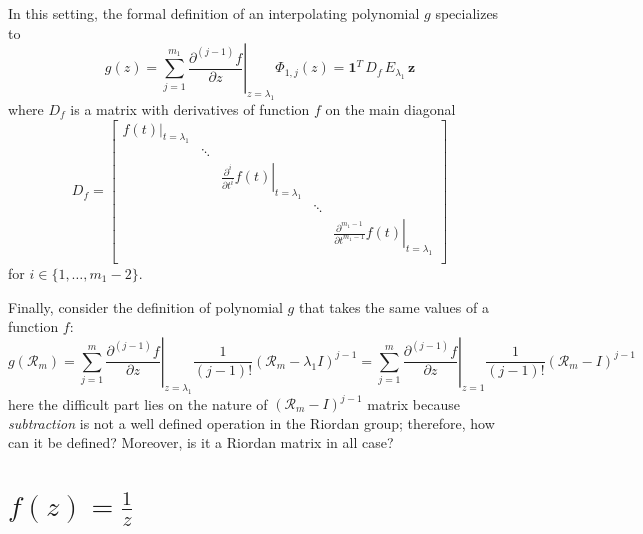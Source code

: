 In this setting, the formal definition of an interpolating polynomial $g$ specializes to
\begin{displaymath}
g(z) = \sum_{j=1}^{m_{1}}{ \left.  \frac{\partial^{(j-1)}{f}}{\partial{z}} \right|_{z=\lambda_{1}}\Phi_{1,j}(z) } = \boldsymbol{1}^{T}\,D_{f}\, E_{\lambda_{1}} \,\boldsymbol{z}
\end{displaymath}
where $D_{f}$ is a matrix with derivatives of function $f$ on the main diagonal
\begin{displaymath}
D_{f} = 
\left[
    \begin{array}{ccccc}
        \left.f(t)\right|_{t=\lambda_{1}} & \\
                                          &  \ddots \\
                                          &         & \left.\frac{\partial^{i}}{\partial t^{i}}f(t)\right|_{t=\lambda_{1}} \\
                                          &         &                                                                       & \ddots \\
                                          &         &                                                                       &        &  \left.\frac{\partial^{m_{1}-1}}{\partial t^{m_{1}-1}}f(t)\right|_{t=\lambda_{1}} \\
    \end{array}
\right]
\end{displaymath}
for $i\in  \lbrace 1,\ldots,m_{1}-2 \rbrace$.


Finally, consider the definition of polynomial $g$ that takes the same values of a 
function $f$:
\begin{displaymath}
    g(\mathcal{R}_{m}) = \sum_{j=1}^{m}{ \left. \frac{\partial^{(j-1)}{f}}{\partial{z}} \right|_{z=\lambda_{1}}\frac{1}{(j-1)!}{(\mathcal{R}_{m}-\lambda_{1}I)^{j-1}} }
                       = \sum_{j=1}^{m}{ \left. \frac{\partial^{(j-1)}{f}}{\partial{z}} \right|_{z=1}\frac{1}{(j-1)!}{(\mathcal{R}_{m}-I)^{j-1}} }
\end{displaymath}
here the difficult part lies on the nature of $(\mathcal{R}_{m}-I)^{j-1}$
matrix because \textit{subtraction} is not a well defined operation in the
Riordan group; therefore, how can it be defined?  Moreover, is it a Riordan
matrix in all case?

\section{$f(z)=\frac{1}{z}$}

